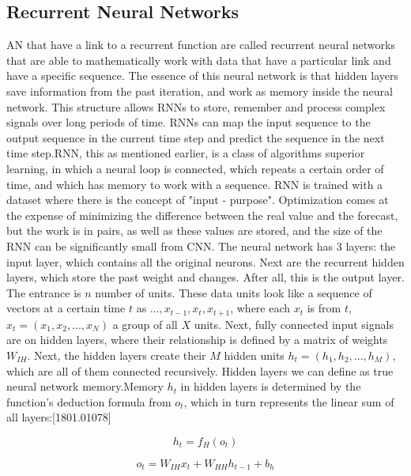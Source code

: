 \subsection{Recurrent Neural Networks}\label{sec:3.8.2}
\par  AN that have a link to a recurrent function are called recurrent neural networks that are able to mathematically work with data that have a particular link and have a specific sequence. The essence of this neural network is that hidden layers save information from the past iteration, and work as memory inside the neural network. This structure allows RNNs to store, remember and process complex signals over long periods of time. RNNs can map the input sequence to the output sequence in the current time step and predict the sequence in the next time step.RNN, this as mentioned earlier, is a class of algorithms superior learning, in which a neural loop is connected, which repeats a certain order of time, and which has memory to work with a sequence. RNN is trained with a dataset where there is the concept of "input - purpose". Optimization comes at the expense of minimizing the difference between the real value and the forecast, but the work is in pairs, as well as these values are stored, and the size of the RNN can be significantly small from CNN.
The neural network has 3 layers: the input layer, which contains all the original neurons. Next are the recurrent hidden layers, which store the past weight and changes. After all, this is the output layer. The entrance is $n$ number of units. These data units look like a sequence of vectors at a certain time $t$ as ${...,x_{t-1},x_t,x_{t+1}}$, where each $x_t$ is from $t$, $x_t = (x_1, x_2, ...,x_N)$ a group of all $X$ units. Next, fully connected input signals are on hidden layers, where their relationship is defined by a matrix of weights $W_{IH}$. Next, the hidden layers create their $M$ hidden units $h_t = (h_1, h_2,...,h_M)$, which are all of them connected recursively. Hidden layers we can define as true neural network memory.Memory $h_t$ in hidden layers is determined by the function's deduction formula from $o_t$, which in turn represents the linear sum of all layers:[1801.01078]

\begin{equation}
h_t = f_H(o_t)
\end{equation}

\begin{equation}
o_t = W_{IH}x_t + W_{HH}h_{t-1} + b_h
\end{equation}

